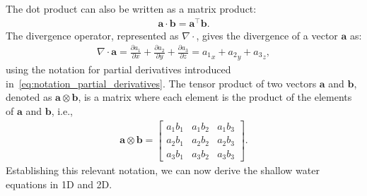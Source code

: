 The dot product can also be written as a matrix product:
\begin{align*}
    \mathbf{a} \cdot \mathbf{b} = \mathbf{a}^\top \mathbf{b}.
\end{align*}
The divergence operator, represented as $\nabla \cdot $, gives the divergence of a vector $\mathbf{a}$ as:
\begin{align*}
    \nabla \cdot \mathbf{a} = \frac{\partial a_1}{\partial x} + \frac{\partial a_2}{\partial y} + \frac{\partial a_3}{\partial z} = {a_1}_x + {a_2}_y + {a_3}_z,
\end{align*}
using the notation for partial derivatives introduced in~\eqref{eq:notation_partial_derivatives}.
The tensor product of two vectors $\mathbf{a}$ and $\mathbf{b}$, denoted as $\mathbf{a} \otimes \mathbf{b}$, is a matrix where each element is the product of the elements of $\mathbf{a}$ and $\mathbf{b}$, i.e.,
\begin{align*}
    \mathbf{a} \otimes \mathbf{b} = \begin{bmatrix}
        a_1 b_1 & a_1 b_2 & a_1 b_3 \\
        a_2 b_1 & a_2 b_2 & a_2 b_3 \\
        a_3 b_1 & a_3 b_2 & a_3 b_3
\end{bmatrix}.
\end{align*}
Establishing this relevant notation, we can now derive the shallow water equations in 1D and 2D.



